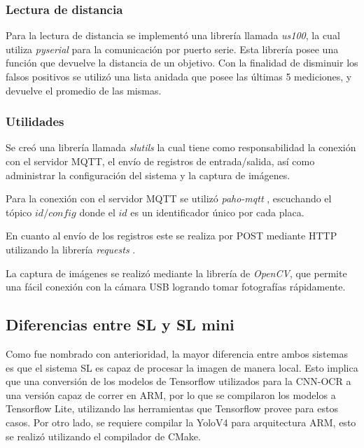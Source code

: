 \subsubsection{Lectura de distancia}

Para la lectura de distancia se implementó una librería llamada \textit{us100}, la cual utiliza \textit{pyserial}  \cite{noauthor_documentacion_nodate-1} para la comunicación por puerto serie.
Esta librería posee una función que devuelve la distancia de un objetivo. Con la finalidad de disminuir los falsos positivos se utilizó una lista anidada que posee las últimas 5 mediciones, y devuelve el promedio de las mismas.

\subsubsection{Utilidades}

Se creó una librería llamada \textit{slutils} la cual tiene como responsabilidad la conexión con el servidor MQTT, el envío de registros de entrada/salida, así como administrar la configuración del sistema y la captura de imágenes.

Para la conexión con el servidor MQTT se utilizó \textit{paho-mqtt} \cite{craggs_documentacion_nodate}, escuchando el tópico \textit{$id/config$} donde el $id$ es un identificador único por cada placa.

En cuanto al envío de los registros este se realiza por POST mediante HTTP utilizando la librería \textit{requests} \cite{python_software_foundation_documentacion_nodate}.

La captura de imágenes se realizó mediante la librería de \textit{OpenCV}, que permite una fácil conexión con la cámara USB logrando tomar fotografías rápidamente.

\subsection{Diferencias entre SL y SL mini}

Como fue nombrado con anterioridad, la mayor diferencia entre ambos sistemas es que el sistema SL es capaz de procesar la imagen de manera local. Esto implica que una conversión de los modelos de Tensorflow \cite{google_tensorflow_nodate} utilizados para la CNN-OCR a una versión capaz de correr en ARM, por lo que se compilaron los modelos a Tensorflow Lite, utilizando las herramientas que Tensorflow provee para estos casos. Por otro lado, se requiere compilar la YoloV4 para arquitectura ARM, esto se realizó utilizando el compilador de CMake.


